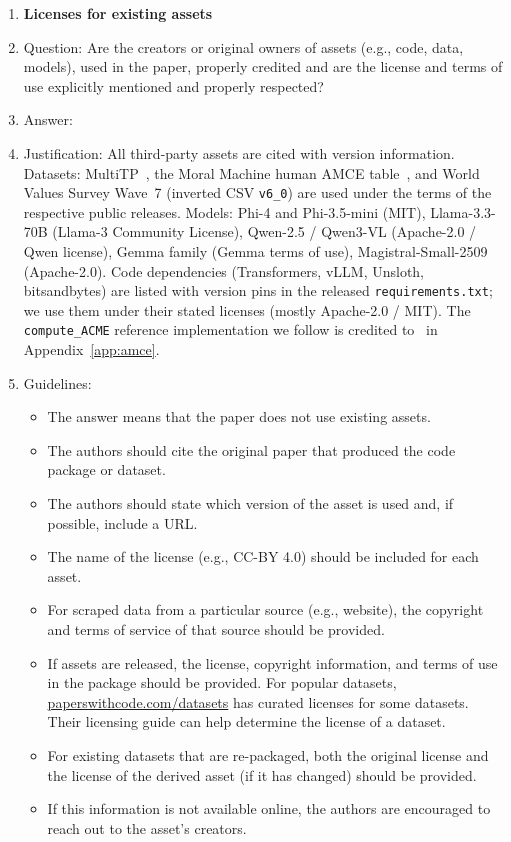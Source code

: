 \begin{enumerate}
\item {\bf Licenses for existing assets}
    \item[] Question: Are the creators or original owners of assets (e.g., code, data, models), used in the paper, properly credited and are the license and terms of use explicitly mentioned and properly respected?
    \item[] Answer: \answerYes{}
    \item[] Justification: \sloppypar All third-party assets are cited with version information. Datasets: MultiTP~\citep{jin2025multitp}, the Moral Machine human AMCE table~\citep{awad2018moral}, and World Values Survey Wave~7 (inverted CSV \texttt{v6\_0}) are used under the terms of the respective public releases. Models: Phi-4 and Phi-3.5-mini (MIT), Llama-3.3-70B (Llama-3 Community License), Qwen-2.5 / Qwen3-VL (Apache-2.0 / Qwen license), Gemma family (Gemma terms of use), Magistral-Small-2509 (Apache-2.0). Code dependencies (Transformers, vLLM, Unsloth, bitsandbytes) are listed with version pins in the released \texttt{requirements.txt}; we use them under their stated licenses (mostly Apache-2.0 / MIT). The \texttt{compute\_ACME} reference implementation we follow is credited to~\citet{jin2025multitp} in Appendix~\ref{app:amce}.
    \item[] Guidelines:
    \begin{itemize}
        \item The answer \answerNA{} means that the paper does not use existing assets.
        \item The authors should cite the original paper that produced the code package or dataset.
        \item The authors should state which version of the asset is used and, if possible, include a URL.
        \item The name of the license (e.g., CC-BY 4.0) should be included for each asset.
        \item For scraped data from a particular source (e.g., website), the copyright and terms of service of that source should be provided.
        \item If assets are released, the license, copyright information, and terms of use in the package should be provided. For popular datasets, \url{paperswithcode.com/datasets} has curated licenses for some datasets. Their licensing guide can help determine the license of a dataset.
        \item For existing datasets that are re-packaged, both the original license and the license of the derived asset (if it has changed) should be provided.
        \item If this information is not available online, the authors are encouraged to reach out to the asset's creators.
    \end{itemize}


\end{enumerate}

